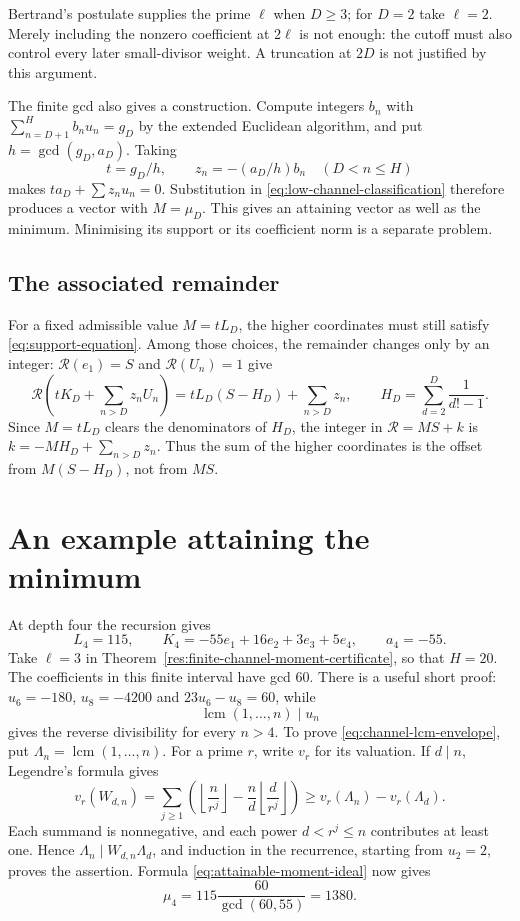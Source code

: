 \documentclass[11pt]{article}
\begin{document}
Bertrand's postulate supplies the prime $\ell$ when $D\ge3$; for
$D=2$ take $\ell=2$. Merely including the nonzero coefficient at
$2\ell$ is not enough: the cutoff must also control every later
small-divisor weight. A truncation at $2D$ is not justified by this
argument.

The finite gcd also gives a construction. Compute integers $b_n$ with
$\sum_{n=D+1}^H b_nu_n=g_D$ by the extended Euclidean algorithm, and put
$h=\gcd(g_D,a_D)$. Taking
\[
 t=g_D/h,\qquad z_n=-(a_D/h)b_n\quad(D<n\le H)
\]
makes $ta_D+\sum z_nu_n=0$. Substitution in
\eqref{eq:low-channel-classification} therefore produces a vector with
$M=\mu_D$. This gives an attaining vector as well as the minimum.
Minimising its support or its coefficient norm is a separate problem.

\subsection{The associated remainder}\label{sec:coordinate-remainder}

For a fixed admissible value $M=tL_D$, the higher coordinates must
still satisfy \eqref{eq:support-equation}. Among those choices, the
remainder changes only by an integer: $\mathcal R(e_1)=S$ and
$\mathcal R(U_n)=1$ give
\begin{equation}
 \mathcal R\left(tK_D+\sum_{n>D}z_nU_n\right)
 =tL_D(S-H_D)+\sum_{n>D}z_n,
 \qquad H_D=\sum_{d=2}^D\frac1{d!-1}.
 \label{eq:residual-transparency}
\end{equation}
Since $M=tL_D$ clears the denominators of $H_D$, the integer in
$\mathcal R=MS+k$ is $k=-MH_D+\sum_{n>D}z_n$. Thus the sum of the
higher coordinates is the offset from $M(S-H_D)$, not from $MS$.

\section{An example attaining the minimum}\label{sec:depth-four}

At depth four the recursion gives
\[
 L_4=115,\qquad
 K_4=-55e_1+16e_2+3e_3+5e_4,\qquad a_4=-55.
\]
Take $\ell=3$ in Theorem~\ref{res:finite-channel-moment-certificate},
so that $H=20$. The coefficients in this finite interval have gcd $60$.
There is a useful short proof: $u_6=-180$, $u_8=-4200$ and
$23u_6-u_8=60$, while
\begin{equation}
 \operatorname{lcm}(1,\ldots,n)\mid u_n
 \label{eq:channel-lcm-envelope}
\end{equation}
gives the reverse divisibility for every $n>4$.
To prove \eqref{eq:channel-lcm-envelope}, put
$\Lambda_n=\operatorname{lcm}(1,\ldots,n)$. For a prime $r$, write $v_r$ for its valuation. If $d\mid n$,
Legendre's formula gives
\[
 v_r(W_{d,n})=\sum_{j\ge1}\left(
 \left\lfloor\frac n{r^j}\right\rfloor
 -\frac nd\left\lfloor\frac d{r^j}\right\rfloor\right)
 \ge v_r(\Lambda_n)-v_r(\Lambda_d).
\]
Each summand is nonnegative, and each power
$d<r^j\le n$ contributes at least one. Hence
$\Lambda_n\mid W_{d,n}\Lambda_d$, and induction in the recurrence,
starting from $u_2=2$, proves the assertion. Formula
\eqref{eq:attainable-moment-ideal} now gives
\[
 \mu_4=115\frac{60}{\gcd(60,55)}=1380.
\]
\end{document}
